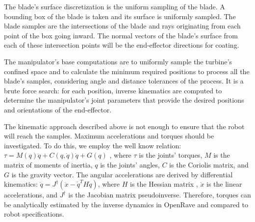 The blade's surface discretization is the uniform sampling of the blade. A
bounding box of the blade is taken and its surface is uniformly sampled.
The blade samples are the intersections of the blade and rays originating from
each point of the box going inward. The normal vectors of the blade's surface
from each of these intersection points will be the end-effector directions for
coating.

The manipulator's base computations are to uniformly sample the turbine's
confined space and to calculate the minimum required positions to process all
the blade's samples, considering angle and distance tolerances of the process.
It is a brute force search: for each position, inverse kinematics are computed
to determine the manipulator's joint parameters that provide the desired
positions and orientations of the end-effector.

The kinematic approach described above is not enough to ensure that the robot
will reach the samples. Maximum accelerations and torques should be
investigated. To do this, we employ the well know relation:
$\tau = M(q)\ddot{q} + C(q,\dot{q})\dot{q} + G(q)$
\cite{sciavicco2000differential}, where $\tau$ is the joints' torques, $M$ is
the matrix of moments of inertia, $q$ is the joints' angles, $C$ is the Coriolis
matrix, and $G$ is the gravity vector.
The angular accelerations are derived by differential kinematics:
$\ddot{q}=J^\dagger(\ddot{x}-\dot{q}^TH\dot{q})$, where $H$ is the Hessian
matrix \cite{hourtash2005kinematic}, $\ddot{x}$ is the linear accelerations, and
$J^\dagger$ is the Jacobian matrix pseudoinverse. Therefore, torques can be
analytically estimated by the inverse dynamics in OpenRave and compared to robot
specifications.

